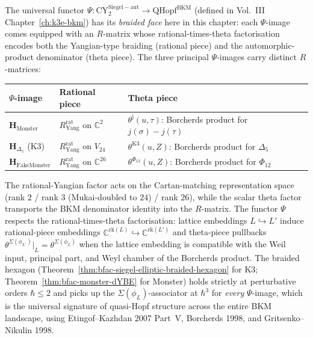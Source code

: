 \begin{remark}
\label{rem:bfac-universal-psi-braided-face}
The universal functor
$\Psi: \mathrm{CY}^{\mathrm{Siegel-aut}}_2 \to \mathrm{QHopf}^{\mathrm{BKM}}$
(defined in Vol.~III Chapter~\ref{ch:k3e-bkm}) has its
\emph{braided face} here in this chapter: each $\Psi$-image comes
equipped with an $R$-matrix whose rational-times-theta factorisation
encodes both the Yangian-type braiding (rational piece) and the
automorphic-product denominator (theta piece). The three principal
$\Psi$-images carry distinct $R$-matrices:
\begin{center}
\renewcommand{\arraystretch}{1.3}
\begin{tabular}{@{}lll@{}}
\toprule
$\Psi$-image & Rational piece & Theta piece \\
\midrule
$\mathbf H_{\mathrm{Monster}}$ & $R^{\mathrm{rat}}_{\mathrm{Yang}}$ on $\mathbb C^2$ & $\theta^{\mathrm j}(u,\tau)$: Borcherds product for $j(\sigma)-j(\tau)$ \\
$\mathbf H_{\Delta_5}$ (K3) & $R^{\mathrm{rat}}_{\mathrm{Yang}}$ on $V_{24}$ & $\theta^{\mathrm{K3}}(u,Z)$: Borcherds product for $\Delta_5$ \\
$\mathbf H_{\mathrm{FakeMonster}}$ & $R^{\mathrm{rat}}_{\mathrm{Yang}}$ on $\mathbb C^{26}$ & $\theta^{\Phi_{12}}(u,Z)$: Borcherds product for $\Phi_{12}$ \\
\bottomrule
\end{tabular}
\end{center}
The rational-Yangian factor acts on the Cartan-matching representation
space (rank $2$ / rank $3$ (Mukai-doubled to $24$) / rank $26$), while
the scalar theta factor transports the BKM denominator identity into
the $R$-matrix. The functor $\Psi$ respects the rational-times-theta
factorisation: lattice embeddings $L\hookrightarrow L'$ induce
rational-piece embeddings $\mathbb C^{\mathrm{rk}(L)}\hookrightarrow
\mathbb C^{\mathrm{rk}(L')}$ and theta-piece pullbacks
$\theta^{\Sigma(\phi_{L'})}|_L = \theta^{\Sigma(\phi_L)}$
when the lattice embedding is compatible with the Weil input, principal
part, and Weyl chamber of the Borcherds product. The
braided hexagon (Theorem~\ref{thm:bfac-siegel-elliptic-braided-hexagon} for K3;
Theorem~\ref{thm:bfac-monster-dYBE} for Monster) holds strictly at
perturbative orders $\hbar\leq 2$ and picks up the
$\Sigma(\phi_L)$-associator at $\hbar^3$ for \emph{every} $\Psi$-image,
which is the universal signature of quasi-Hopf structure across the
entire BKM landscape, using Etingof--Kazhdan 2007 Part~V,
Borcherds 1998, and Gritsenko--Nikulin 1998.
\end{remark}

